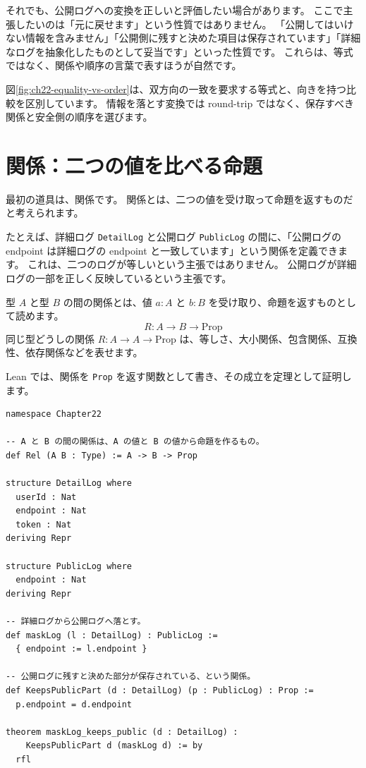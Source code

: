 それでも、公開ログへの変換を正しいと評価したい場合があります。
ここで主張したいのは「元に戻せます」という性質ではありません。
「公開してはいけない情報を含みません」「公開側に残すと決めた項目は保存されています」「詳細なログを抽象化したものとして妥当です」といった性質です。
これらは、等式ではなく、関係や順序の言葉で表すほうが自然です。

図\ref{fig:ch22-equality-vs-order}は、双方向の一致を要求する等式と、向きを持つ比較を区別しています。
情報を落とす変換では round-trip ではなく、保存すべき関係と安全側の順序を選びます。


\section{関係：二つの値を比べる命題}

最初の道具は、関係です。
関係とは、二つの値を受け取って命題を返すものだと考えられます。

たとえば、詳細ログ \texttt{DetailLog} と公開ログ \texttt{PublicLog} の間に、「公開ログの endpoint は詳細ログの endpoint と一致しています」という関係を定義できます。
これは、二つのログが等しいという主張ではありません。
公開ログが詳細ログの一部を正しく反映しているという主張です。

型 \(A\) と型 \(B\) の間の関係とは、値 \(a : A\) と \(b : B\) を受け取り、命題を返すものとして読めます。
\[
  R : A \to B \to \mathrm{Prop}
\]
同じ型どうしの関係 \(R : A \to A \to \mathrm{Prop}\) は、等しさ、大小関係、包含関係、互換性、依存関係などを表せます。

Lean では、関係を \texttt{Prop} を返す関数として書き、その成立を定理として証明します。

\begin{listing}[htbp]
\begin{verbatim}
namespace Chapter22

-- A と B の間の関係は、A の値と B の値から命題を作るもの。
def Rel (A B : Type) := A -> B -> Prop

structure DetailLog where
  userId : Nat
  endpoint : Nat
  token : Nat
deriving Repr

structure PublicLog where
  endpoint : Nat
deriving Repr

-- 詳細ログから公開ログへ落とす。
def maskLog (l : DetailLog) : PublicLog :=
  { endpoint := l.endpoint }

-- 公開ログに残すと決めた部分が保存されている、という関係。
def KeepsPublicPart (d : DetailLog) (p : PublicLog) : Prop :=
  p.endpoint = d.endpoint

theorem maskLog_keeps_public (d : DetailLog) :
    KeepsPublicPart d (maskLog d) := by
  rfl
\end{verbatim}
\caption{\texttt{KeepsPublicPart}}
\label{lst:ch22-relation}
\end{listing}

